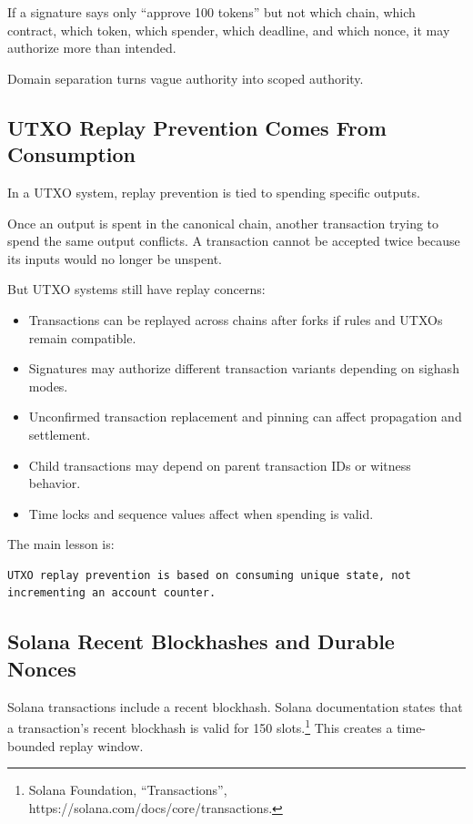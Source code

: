 If a signature says only ``approve 100 tokens'' but not which chain,
which contract, which token, which spender, which deadline, and which
nonce, it may authorize more than intended.

Domain separation turns vague authority into scoped authority.

\subsection{UTXO Replay Prevention Comes From Consumption}

In a UTXO system, replay prevention is tied to spending specific
outputs.

Once an output is spent in the canonical chain, another transaction
trying to spend the same output conflicts. A transaction cannot be
accepted twice because its inputs would no longer be unspent.

But UTXO systems still have replay concerns:

\begin{itemize}
\tightlist
\item
  Transactions can be replayed across chains after forks if rules and
  UTXOs remain compatible.
\item
  Signatures may authorize different transaction variants depending on
  sighash modes.
\item
  Unconfirmed transaction replacement and pinning can affect propagation
  and settlement.
\item
  Child transactions may depend on parent transaction IDs or witness
  behavior.
\item
  Time locks and sequence values affect when spending is valid.
\end{itemize}

The main lesson is:

\begin{lstlisting}
UTXO replay prevention is based on consuming unique state, not incrementing an account counter.
\end{lstlisting}

\subsection{Solana Recent Blockhashes and Durable Nonces}

Solana transactions include a recent blockhash. Solana documentation
states that a transaction's recent blockhash is valid for 150
slots.\footnote{Solana Foundation, ``Transactions'',
  https://solana.com/docs/core/transactions.} This creates a
time-bounded replay window.

